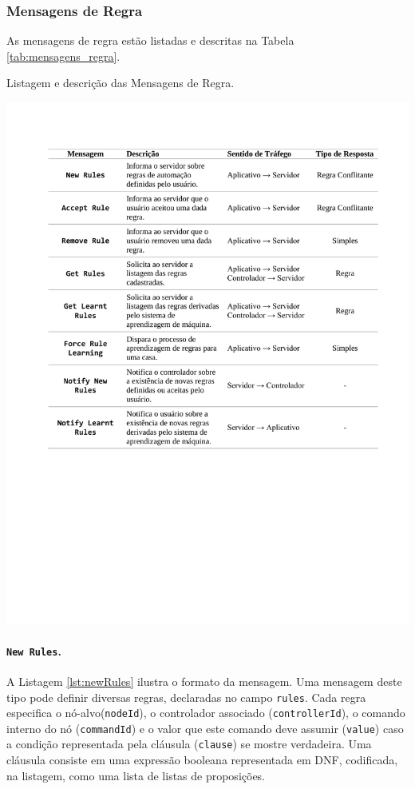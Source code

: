 \subsubsection{Mensagens de Regra}
As mensagens de regra estão listadas e descritas na Tabela \ref{tab:mensagens_regra}.

\begin{table}[h]
	\centering
	\caption{Listagem e descrição das Mensagens de Regra.}\smallskip
	\label{tab:mensagens_regra}
	\includegraphics[width=\textwidth]{tabelas/mensagens_regra.pdf}
\end{table}

\paragraph*{\texttt{New Rules}.} A Listagem \ref{lst:newRules} ilustra o formato da mensagem. Uma mensagem deste tipo pode definir diversas regras, declaradas no campo \texttt{rules}. Cada regra especifica o nó-alvo(\texttt{nodeId}), o controlador associado (\texttt{controllerId}), o comando interno do nó (\texttt{commandId}) e o valor que este comando deve assumir (\texttt{value}) caso a condição representada pela cláusula (\texttt{clause}) se mostre verdadeira. Uma cláusula consiste em uma expressão booleana representada em DNF, codificada, na listagem, como uma lista de listas de proposições.


